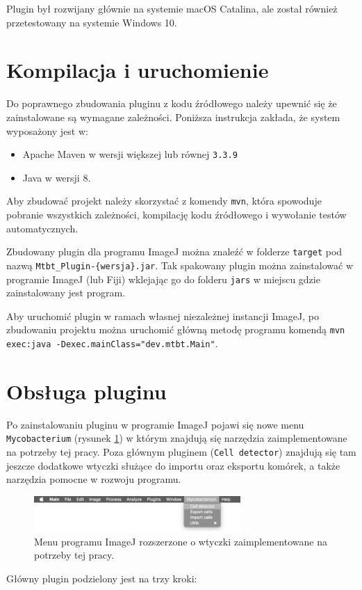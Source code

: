\documentclass[declaration,shortabstract,mgr]{iithesis}
\begin{document}
Plugin był rozwijany głównie na systemie macOS Catalina, ale został również przetestowany na systemie Windows 10. 

\section{Kompilacja i uruchomienie}

Do poprawnego zbudowania pluginu z kodu źródłowego należy upewnić się że zainstalowane są wymagane zależności. Poniższa instrukcja zakłada, że system wyposażony jest w:

\begin{itemize}
  \item Apache Maven w wersji większej lub równej \texttt{3.3.9}
  \item Java w wersji 8.
\end{itemize}

Aby zbudować projekt należy skorzystać z komendy \texttt{mvn}, która spowoduje pobranie wszystkich zależności,  kompilację kodu źródłowego i wywołanie testów automatycznych.

Zbudowany plugin dla programu ImageJ można znaleźć w folderze \texttt{target} pod nazwą \texttt{Mtbt\_Plugin-\{wersja\}.jar}. Tak spakowany plugin można zainstalować w programie ImageJ (lub Fiji) wklejając go do folderu \texttt{jars} w miejscu gdzie zainstalowany jest program.

Aby uruchomić plugin w ramach własnej niezależnej instancji ImageJ, po zbudowaniu projektu można uruchomić główną metodę programu komendą
\linebreak\texttt{mvn exec:java -Dexec.mainClass="dev.mtbt.Main"}.


\section{Obsługa pluginu}
\label{sec:user-manual}

Po zainstalowaniu pluginu w programie ImageJ pojawi się nowe menu \texttt{Mycobacterium} (rysunek \ref{fig:ui-menu}) w którym znajdują się narzędzia zaimplementowane na potrzeby tej pracy. Poza głównym pluginem (\texttt{Cell detector}) znajdują się tam jeszcze dodatkowe wtyczki służące do importu oraz eksportu komórek, a także narzędzia pomocne w rozwoju programu.
\begin{figure}
  \centering
  \includegraphics[width=0.7\textwidth]{images/ui-menu.png}
  \caption{Menu programu ImageJ rozszerzone o wtyczki zaimplementowane na potrzeby tej pracy.}
  \label{fig:ui-menu}
\end{figure}
Główny plugin podzielony jest na trzy kroki:
\end{document}
